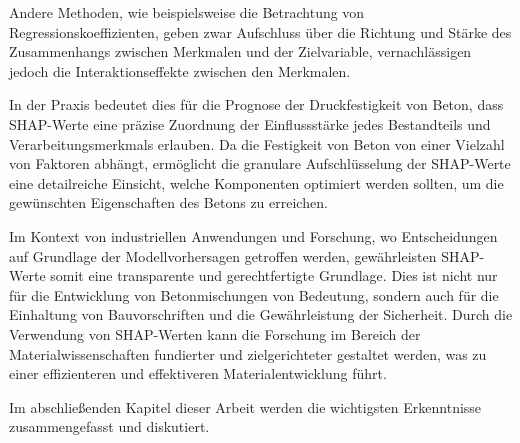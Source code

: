 Andere Methoden, wie beispielsweise die Betrachtung von Regressionskoeffizienten, 
geben zwar Aufschluss über die Richtung und Stärke des Zusammenhangs zwischen Merkmalen 
und der Zielvariable, vernachlässigen jedoch die Interaktionseffekte zwischen den Merkmalen.

In der Praxis bedeutet dies für die Prognose der Druckfestigkeit von Beton, 
dass SHAP-Werte eine präzise Zuordnung der Einflussstärke jedes Bestandteils 
und Verarbeitungsmerkmals erlauben. Da die Festigkeit von Beton von einer Vielzahl von 
Faktoren abhängt, ermöglicht die granulare Aufschlüsselung der SHAP-Werte eine 
detailreiche Einsicht, welche Komponenten optimiert werden sollten, um die gewünschten 
Eigenschaften des Betons zu erreichen.

Im Kontext von industriellen Anwendungen und Forschung, wo Entscheidungen auf Grundlage 
der Modellvorhersagen getroffen werden, gewährleisten SHAP-Werte somit eine transparente 
und gerechtfertigte Grundlage. Dies ist nicht nur für die Entwicklung von Betonmischungen 
von Bedeutung, sondern auch für die Einhaltung von Bauvorschriften und die Gewährleistung 
der Sicherheit. Durch die Verwendung von SHAP-Werten kann die Forschung im Bereich 
der Materialwissenschaften fundierter und zielgerichteter gestaltet werden, was zu einer 
effizienteren und effektiveren Materialentwicklung führt.

Im abschließenden Kapitel dieser Arbeit werden die wichtigsten Erkenntnisse zusammengefasst 
und diskutiert.

